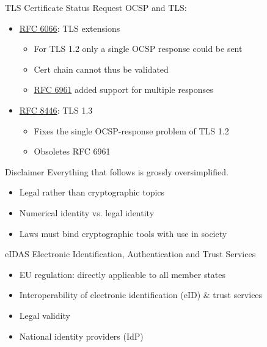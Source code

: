 \begin{frame}{TLS Certificate Status Request}
  OCSP and TLS:
  \begin{itemize}
    \pause \item \href{https://datatracker.ietf.org/doc/html/rfc6066}{RFC 6066}: TLS extensions
    \begin{itemize}
      \item For TLS 1.2 only a single OCSP response could be sent
      \item Cert chain cannot thus be validated
      \item \href{https://datatracker.ietf.org/doc/html/rfc6961}{RFC 6961} added support for multiple responses
    \end{itemize}
    \pause \item \href{https://datatracker.ietf.org/doc/html/rfc8446}{RFC 8446}: TLS 1.3
    \begin{itemize}
      \item Fixes the single OCSP-response problem of TLS 1.2
      \item Obsoletes RFC 6961
    \end{itemize}
  \end{itemize}
\end{frame}

\begin{frame}{Disclaimer}
  \pause
  Everything that follows is grossly oversimplified.
  \begin{itemize}
    \item Legal rather than cryptographic topics
    \item Numerical identity vs. legal identity
    \item Laws must bind cryptographic tools with use in society
  \end{itemize}
\end{frame}

\begin{frame}{eIDAS}
  Electronic Identification, Authentication and Trust Services
  \begin{itemize}[<+(1)->]
    \item EU regulation: directly applicable to all member states
    \item Interoperability of electronic identification (eID) \& trust services
    \item Legal validity
    \item National identity providers (IdP)
  \end{itemize}
\end{frame}

